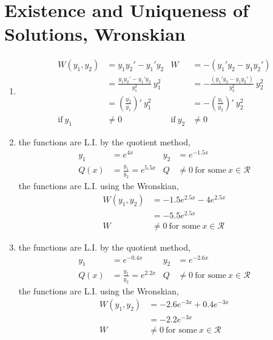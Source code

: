 \section{Existence and Uniqueness of Solutions, Wronskian}

\begin{enumerate}
    \item \begin{align}
              W(y_{1}, y_{2})  & = y_{1}y_{2}' - y_{1}'y_{2}                              & W                & = -(y_{1}'y_{2} - y_{1}y_{2}')                              \\
                               & = \frac{y_{1}y_{2}' - y_{1}'y_{2}}{y_{1}^{2}}\ y_{1}^{2} &                  & = -\frac{(y_{1}'y_{2} - y_{1}y_{2}')}{y_{2}^{2}}\ y_{2}^{2} \\
                               & = \left( \frac{y_{2}}{y_{1}} \right)'\ y_{1}^{2}         &                  & = -\left( \frac{y_{1}}{y_{2}} \right)'\ y_{2}^{2}           \\
              \text{if}\ y_{1} & \neq 0                                                   & \text{if}\ y_{2} & \neq 0
          \end{align}

    \item the functions are L.I. by the quotient method,
          \begin{align}
              y_{1} & = e^{4x}                         & y_{2} & = e^{-1.5x}                                \\
              Q(x)  & = \frac{y_{1}}{y_{2}} = e^{5.5x} & Q     & \neq 0\ \text{for some}\ x \in \mathcal{R}
          \end{align}
          the functions are L.I. using the Wronskian,
          \begin{align}
              W(y_{1}, y_{2}) & = -1.5e^{2.5x} - 4e^{2.5x}                 \\
                              & = -5.5e^{2.5x}                             \\
              W               & \neq 0\ \text{for some}\ x \in \mathcal{R}
          \end{align}

    \item the functions are L.I. by the quotient method,
          \begin{align}
              y_{1} & = e^{-0.4x}                      & y_{2} & = e^{-2.6x}                                \\
              Q(x)  & = \frac{y_{1}}{y_{2}} = e^{2.2x} & Q     & \neq 0\ \text{for some}\ x \in \mathcal{R}
          \end{align}
          the functions are L.I. using the Wronskian,
          \begin{align}
              W(y_{1}, y_{2}) & = -2.6e^{-3x} + 0.4e^{-3x}                 \\
                              & = -2.2e^{-3x}                              \\
              W               & \neq 0\ \text{for some}\ x \in \mathcal{R}
          \end{align}


\end{enumerate}
